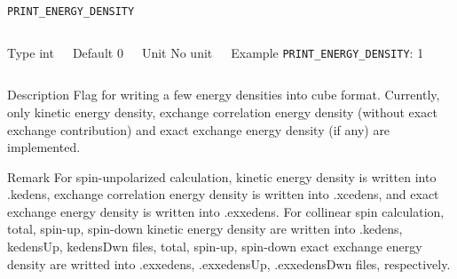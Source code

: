 \begin{frame}[allowframebreaks]{\texttt{PRINT\_ENERGY\_DENSITY}} \label{PRINT_ENERGY_DENSITY}
\vspace*{-12pt}
\begin{columns}
\begin{block}{Type}
int
\end{block}

\begin{block}{Default}
0
\end{block}

\begin{block}{Unit}
No unit
\end{block}

\begin{block}{Example}
\texttt{PRINT\_ENERGY\_DENSITY}: 1
\end{block}
\end{columns}

\begin{block}{Description}
Flag for writing a few energy densities into cube format. Currently, only kinetic energy density, exchange correlation energy density (without exact exchange contribution) and exact exchange energy density (if any) are implemented. 
\end{block}

\begin{block}{Remark}
For spin-unpolarized calculation, kinetic energy density is written into .kedens, exchange correlation energy density is written into .xcedens, and exact exchange energy density is written into .exxedens. For collinear spin calculation, total, spin-up, spin-down kinetic energy density are written into .kedens, kedensUp, kedensDwn files, total, spin-up, spin-down exact exchange energy density are writted into .exxedens, .exxedensUp, .exxedensDwn files, respectively. 
\end{block}
\end{frame}

